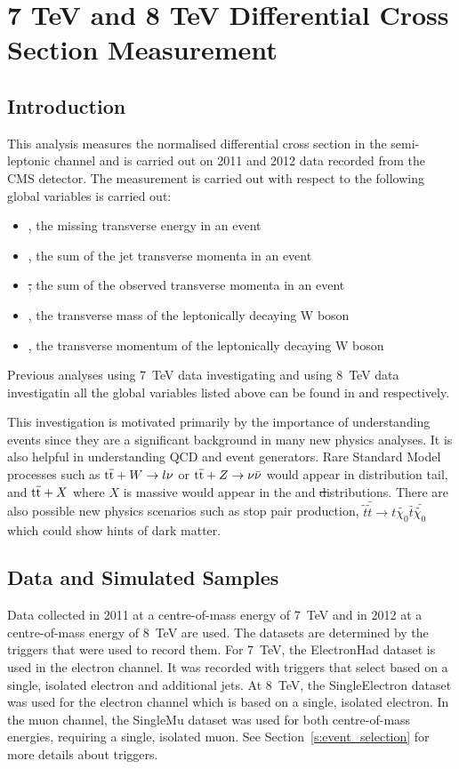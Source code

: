 \chapter{7 TeV and 8 TeV Differential Cross Section Measurement}
\label{c:Differential_Cross_Section}

\section{Introduction}
\label{s:xsections_introduction}
This analysis measures the normalised differential \ttbar cross section in the semi-leptonic channel and is
carried out on 2011 and 2012 data recorded from the CMS detector. The measurement is carried out with respect
to the following global variables is carried out:
\begin {itemize}
  \item {\met, the missing transverse energy in an event}
  \item {\HT, the sum of the jet transverse momenta in an event}
  \item {\st, the sum of the observed transverse momenta in an event}
  \item {\mt, the transverse mass of the leptonically decaying W boson}
  \item {\wpt, the transverse momentum of the leptonically decaying W boson}
\end{itemize}

Previous analyses using 7~TeV data investigating \met and using 8~TeV data investigatin all the global
variables listed above can be found in \cite{CMS-PAS-TOP-12-019} and \cite{CMS-PAS-TOP-12-042} respectively.

This investigation is motivated primarily by the importance of understanding \ttbar events since they are a
significant background in many new physics analyses. It is also helpful in understanding QCD and event
generators. Rare Standard Model processes such as $\mathrm{t}\overline{\mathrm{t}} + W\rightarrow l\nu$ or $\mathrm{t}\overline{\mathrm{t}} + Z\rightarrow
\nu\bar{\nu}$ would appear in \met distribution tail, and $\mathrm{t}\overline{\mathrm{t}} + X$ where $X$ is massive would appear in
the \HT and \st distributions. There are also possible new physics scenarios such as stop pair production,
$\tilde{t}\bar{\tilde{t}} \rightarrow t\tilde{\chi_0} \bar{t}\bar{\tilde{\chi_0}}$ which could show
hints of dark matter.

\section{Data and Simulated Samples}
\label{s:data_and_simulated_samples}
Data collected in 2011 at a centre-of-mass energy of 7~TeV and in 2012 at a centre-of-mass energy of 8~TeV are
used. The datasets are determined by the triggers that were used to record them. For 7~TeV, the ElectronHad
dataset is used in the electron channel. It was recorded with triggers that select based on a single,
isolated electron and additional jets. At 8~TeV, the SingleElectron dataset was used for the electron
channel which is based on a single, isolated electron. In the muon channel, the SingleMu dataset was used
for both centre-of-mass energies, requiring a single, isolated muon. See Section~\ref{s:event_selection} for
more details about triggers.

